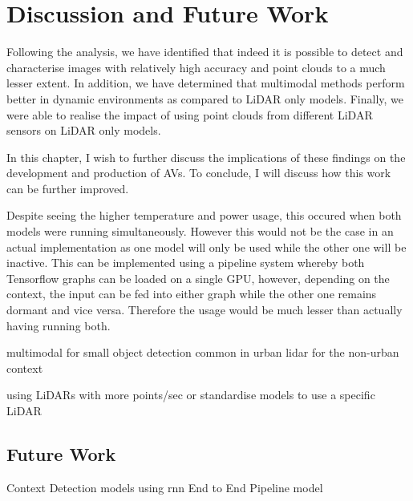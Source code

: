 %
%
\let\textcircled=\pgftextcircled
\chapter{Discussion and Future Work}
\label{chap:fw}

Following the analysis, we have identified that indeed it is possible to detect and characterise images with relatively high accuracy and point clouds to a much lesser extent. In addition, we have determined that multimodal methods perform better in dynamic environments as compared to LiDAR only models. Finally, we were able to realise the impact of using point clouds from different LiDAR sensors on LiDAR only models. 

In this chapter, I wish to further discuss the implications of these findings on the development and production of AVs. To conclude, I will discuss how this work can be further improved. 

Despite seeing the higher temperature and power usage, this occured when both models were running simultaneously. However this would not be the case in an actual implementation as one model will only be used while the other one will be inactive. This can be implemented using a pipeline system whereby both Tensorflow graphs can be loaded on a single GPU, however, depending on the context, the input can be fed into  either graph while the other one remains dormant and vice versa. Therefore the usage would be much lesser than actually having running both. 



multimodal for small object detection  common in urban
lidar for the non-urban context 

using LiDARs with more points/sec or standardise models to use a specific LiDAR

\section{Future Work}
Context Detection models using rnn 
End to End Pipeline model 
